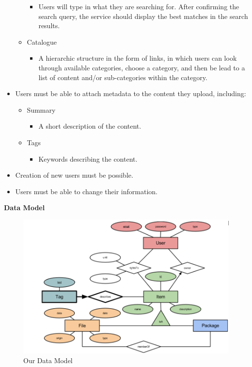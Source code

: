 \documentclass[10pt,a4paper]{article}
\begin{document}
\begin{itemize}
\begin{itemize}
\begin{itemize}
\item Users will type in what they are searching for. After confirming the search query, the service should display the best matches in the search results.
\end{itemize}
\item Catalogue
\begin{itemize}
\item A hierarchic structure in the form of links, in which users can look through available categories, choose a category, and then be lead to a list of content and/or sub-categories within the category.
\end{itemize}
\end{itemize}
\item Users must be able to attach metadata to the content they upload, including:
\begin{itemize}
\item Summary
\begin{itemize}
\item A short description of the content.
\end{itemize}
\end{itemize}
\begin{itemize}
\item Tags
\begin{itemize}
\item Keywords describing the content.
\end{itemize}
\end{itemize}
\item Creation of new users must be possible.
\item Users must be able to change their information.
\end{itemize}

{\bfseries Data Model}\\

\begin{figure}
\centering
\includegraphics[width=14cm]{datamodel.png}
\caption{Our Data Model}
\label{dm}
\end{figure}
\newpage
\end{document}
